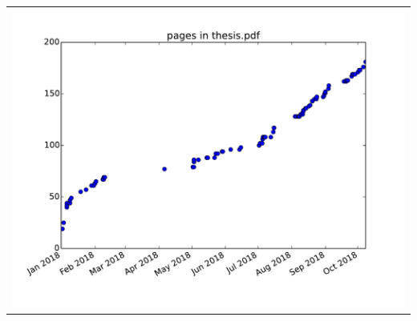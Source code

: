 \documentclass[12pt]{cmuthesis}
\begin{document}
\newpage
\thispagestyle{empty}
\begin{center}
\begin{tabular}{c}
\vspace{12em} \\
\includegraphics[width=\textwidth]{pages.pdf}
\end{tabular}
\end{center}

%

\backmatter


\renewcommand{\bibsection}{\chapter{\bibname}
\inspirationalquote{Only a doctor of philosophy, Darth.}{Robert Marsh}
}


\end{document}
